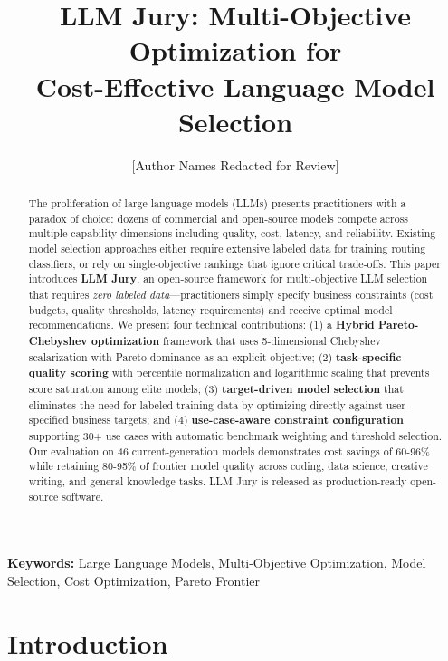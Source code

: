 \documentclass[11pt,a4paper]{article}
\title{LLM Jury: Multi-Objective Optimization for\\Cost-Effective Language Model Selection}
\author{[Author Names Redacted for Review]}
\affil{[Institution Redacted], [City], [Country]}
\date{}
\begin{document}
\maketitle

\begin{abstract}
The proliferation of large language models (LLMs) presents practitioners with a paradox of choice: dozens of commercial and open-source models compete across multiple capability dimensions including quality, cost, latency, and reliability. Existing model selection approaches either require extensive labeled data for training routing classifiers, or rely on single-objective rankings that ignore critical trade-offs. This paper introduces \textbf{LLM Jury}, an open-source framework for multi-objective LLM selection that requires \textit{zero labeled data}---practitioners simply specify business constraints (cost budgets, quality thresholds, latency requirements) and receive optimal model recommendations. We present four technical contributions: (1) a \textbf{Hybrid Pareto-Chebyshev optimization} framework that uses 5-dimensional Chebyshev scalarization with Pareto dominance as an explicit objective; (2) \textbf{task-specific quality scoring} with percentile normalization and logarithmic scaling that prevents score saturation among elite models; (3) \textbf{target-driven model selection} that eliminates the need for labeled training data by optimizing directly against user-specified business targets; and (4) \textbf{use-case-aware constraint configuration} supporting 30+ use cases with automatic benchmark weighting and threshold selection. Our evaluation on 46 current-generation models demonstrates cost savings of 60-96\% while retaining 80-95\% of frontier model quality across coding, data science, creative writing, and general knowledge tasks. LLM Jury is released as production-ready open-source software.
\end{abstract}

\noindent\textbf{Keywords:} Large Language Models, Multi-Objective Optimization, Model Selection, Cost Optimization, Pareto Frontier

\vspace{1em}


\section{Introduction}
\end{document}

